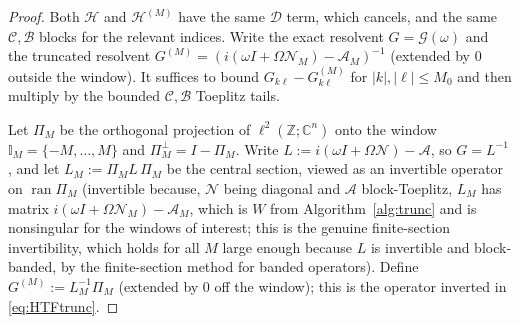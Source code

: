 \documentclass{amsart}
\theoremstyle{definition}
\newcommand{\C}{\mathbb{C}}
\newcommand{\Z}{\mathbb{Z}}
\newcommand{\Acal}{\mathcal{A}}
\newcommand{\Bcal}{\mathcal{B}}
\newcommand{\Ccal}{\mathcal{C}}
\newcommand{\Dcal}{\mathcal{D}}
\newcommand{\Hcal}{\mathcal{H}}
\newcommand{\Ncal}{\mathcal{N}}
\begin{document}
\begin{proof}
Both $\Hcal$ and $\Hcal^{(M)}$ have the same $\Dcal$ term, which cancels, and
the same $\Ccal,\Bcal$ blocks for the relevant indices. Write the exact resolvent
$G=\mathcal G(\omega)$ and the truncated resolvent
$G^{(M)}=(i(\omega I+\Omega\Ncal_M)-\Acal_M)^{-1}$ (extended by $0$ outside the
window). It suffices to bound $G_{k\ell}-G^{(M)}_{k\ell}$ for $|k|,|\ell|\le M_0$
and then multiply by the bounded $\Ccal,\Bcal$ Toeplitz tails.

Let $\Pi_M$ be the orthogonal projection of $\ell^2(\Z;\C^n)$ onto the window
$\mathbb I_M=\{-M,\dots,M\}$ and $\Pi_M^\perp=I-\Pi_M$. Write
$L:=i(\omega I+\Omega\Ncal)-\Acal$, so $G=L^{-1}$, and let
$L_M:=\Pi_M L\,\Pi_M$ be the central section, viewed as an invertible operator
on $\operatorname{ran}\Pi_M$ (invertible because, $\Ncal$ being diagonal and
$\Acal$ block-Toeplitz, $L_M$ has matrix $i(\omega I+\Omega\Ncal_M)-\Acal_M$,
which is $W$ from Algorithm~\ref{alg:trunc} and is nonsingular for the windows of
interest; this is the genuine finite-section invertibility, which holds for all
$M$ large enough because $L$ is invertible and block-banded, by the
finite-section method for banded operators). Define
$G^{(M)}:=L_M^{-1}\Pi_M$ (extended by $0$ off the window); this is the operator
inverted in \eqref{eq:HTFtrunc}.


\end{proof}
\end{document}
